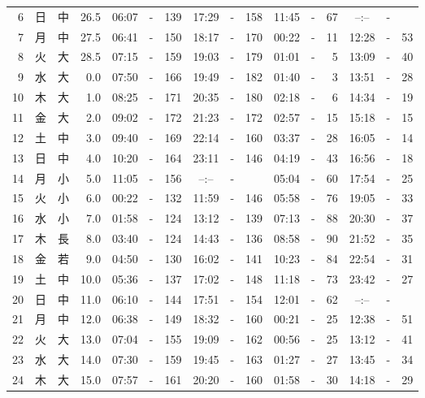 \documentclass[12pt.a4j]{jsarticle}
\begin{document}
\begin{center}
\begin{table}[ht]
\begin{tabular}{|rc|cr|ccrccr|ccrccr|}
 6 & 日 & 中 & 26.5 &  06:07 &-& 139  &  17:29 &-& 158  &   11:45 &-&  67  &   --:-- &-&     \\
 7 & 月 & 中 & 27.5 &  06:41 &-& 150  &  18:17 &-& 170  &   00:22 &-&  11  &   12:28 &-&  53  \\
 8 & 火 & 大 & 28.5 &  07:15 &-& 159  &  19:03 &-& 179  &   01:01 &-&   5  &   13:09 &-&  40  \\
 9 & 水 & 大 &  0.0 &  07:50 &-& 166  &  19:49 &-& 182  &   01:40 &-&   3  &   13:51 &-&  28  \\
10 & 木 & 大 &  1.0 &  08:25 &-& 171  &  20:35 &-& 180  &   02:18 &-&   6  &   14:34 &-&  19  \\
11 & 金 & 大 &  2.0 &  09:02 &-& 172  &  21:23 &-& 172  &   02:57 &-&  15  &   15:18 &-&  15  \\
12 & 土 & 中 &  3.0 &  09:40 &-& 169  &  22:14 &-& 160  &   03:37 &-&  28  &   16:05 &-&  14  \\
13 & 日 & 中 &  4.0 &  10:20 &-& 164  &  23:11 &-& 146  &   04:19 &-&  43  &   16:56 &-&  18  \\
14 & 月 & 小 &  5.0 &  11:05 &-& 156  &  --:-- &-&     &   05:04 &-&  60  &   17:54 &-&  25  \\
15 & 火 & 小 &  6.0 &  00:22 &-& 132  &  11:59 &-& 146  &   05:58 &-&  76  &   19:05 &-&  33  \\
16 & 水 & 小 &  7.0 &  01:58 &-& 124  &  13:12 &-& 139  &   07:13 &-&  88  &   20:30 &-&  37  \\
17 & 木 & 長 &  8.0 &  03:40 &-& 124  &  14:43 &-& 136  &   08:58 &-&  90  &   21:52 &-&  35  \\
18 & 金 & 若 &  9.0 &  04:50 &-& 130  &  16:02 &-& 141  &   10:23 &-&  84  &   22:54 &-&  31  \\
19 & 土 & 中 & 10.0 &  05:36 &-& 137  &  17:02 &-& 148  &   11:18 &-&  73  &   23:42 &-&  27  \\
20 & 日 & 中 & 11.0 &  06:10 &-& 144  &  17:51 &-& 154  &   12:01 &-&  62  &   --:-- &-&     \\
21 & 月 & 中 & 12.0 &  06:38 &-& 149  &  18:32 &-& 160  &   00:21 &-&  25  &   12:38 &-&  51  \\
22 & 火 & 大 & 13.0 &  07:04 &-& 155  &  19:09 &-& 162  &   00:56 &-&  25  &   13:12 &-&  41  \\
23 & 水 & 大 & 14.0 &  07:30 &-& 159  &  19:45 &-& 163  &   01:27 &-&  27  &   13:45 &-&  34  \\
24 & 木 & 大 & 15.0 &  07:57 &-& 161  &  20:20 &-& 160  &   01:58 &-&  30  &   14:18 &-&  29  \\

\end{tabular}
\end{table}
\end{center}
\end{document}
